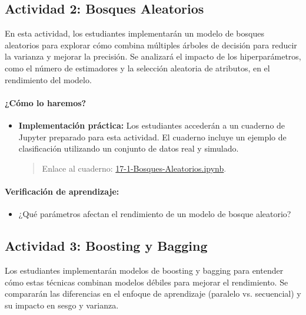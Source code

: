 \documentclass[a4,11pt]{aleph-notas}
\begin{document}
\subsection*{Actividad 2: Bosques Aleatorios}

En esta actividad, los estudiantes implementarán un modelo de bosques aleatorios para explorar cómo combina múltiples árboles de decisión para reducir la varianza y mejorar la precisión. Se analizará el impacto de los hiperparámetros, como el número de estimadores y la selección aleatoria de atributos, en el rendimiento del modelo.

\paragraph{¿Cómo lo haremos?}  
\begin{itemize}[leftmargin=*]
    \item \textbf{Implementación práctica:}  
    Los estudiantes accederán a un cuaderno de Jupyter preparado para esta actividad. El cuaderno incluye un ejemplo de clasificación utilizando un conjunto de datos real y simulado.  
    \begin{quote}
        Enlace al cuaderno: \href{https://colab.research.google.com/github/andres-merino/AprendizajeAutomaticoInicial-05-N0105/blob/main/2-Notebooks/17-1-Bosques-Aleatorios.ipynb}{17-1-Bosques-Aleatorios.ipynb}.
    \end{quote}
\end{itemize}

\paragraph{Verificación de aprendizaje:}  
\begin{itemize}[leftmargin=*]
    \item ¿Qué parámetros afectan el rendimiento de un modelo de bosque aleatorio?   
\end{itemize}  

\subsection*{Actividad 3: Boosting y Bagging}

Los estudiantes implementarán modelos de boosting y bagging para entender cómo estas técnicas combinan modelos débiles para mejorar el rendimiento. Se compararán las diferencias en el enfoque de aprendizaje (paralelo vs. secuencial) y su impacto en sesgo y varianza.
\end{document}
